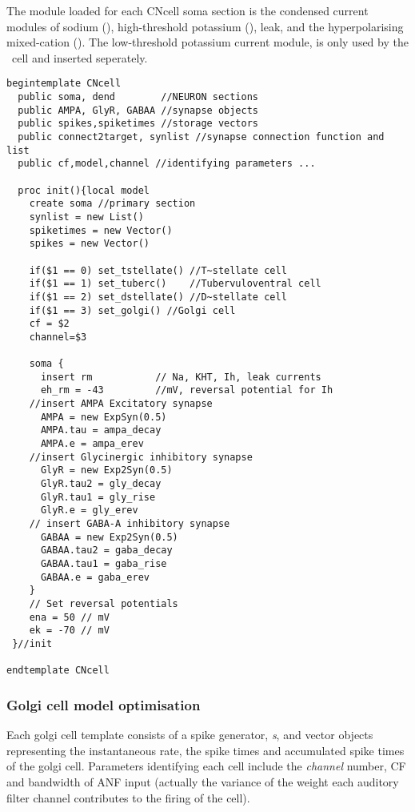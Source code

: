 The  module loaded for each \textsf{CNcell} soma section is the condensed
current modules of sodium (), high-threshold potassium (), leak,
and the hyperpolarising mixed-cation ().  The low-threshold potassium
current module, is only used by the \DS~cell and inserted seperately.

\begin{lstlisting}[label=lst:CellTemplate,caption=Rothman and Manis cochlear
  nucleus cell template (in CNcell.tem)]
  begintemplate CNcell
  public soma, dend        //NEURON sections
  public AMPA, GlyR, GABAA //synapse objects
  public spikes,spiketimes //storage vectors
  public connect2target, synlist //synapse connection function and list
  public cf,model,channel //identifying parameters ...

  proc init(){local model
    create soma //primary section
    synlist = new List()
    spiketimes = new Vector()
    spikes = new Vector()

    if($1 == 0) set_tstellate() //T~stellate cell
    if($1 == 1) set_tuberc()    //Tubervuloventral cell
    if($1 == 2) set_dstellate() //D~stellate cell
    if($1 == 3) set_golgi() //Golgi cell
    cf = $2
    channel=$3

    soma {
      insert rm           // Na, KHT, Ih, leak currents
      eh_rm = -43         //mV, reversal potential for Ih
    //insert AMPA Excitatory synapse
      AMPA = new ExpSyn(0.5)
      AMPA.tau = ampa_decay
      AMPA.e = ampa_erev
    //insert Glycinergic inhibitory synapse
      GlyR = new Exp2Syn(0.5)
      GlyR.tau2 = gly_decay
      GlyR.tau1 = gly_rise
      GlyR.e = gly_erev
    // insert GABA-A inhibitory synapse
      GABAA = new Exp2Syn(0.5)
      GABAA.tau2 = gaba_decay
      GABAA.tau1 = gaba_rise
      GABAA.e = gaba_erev
    }
    // Set reversal potentials
    ena = 50 // mV
    ek = -70 // mV
 }//init

endtemplate CNcell

\end{lstlisting}



\subsubsection[Golgi model]{Golgi cell model
  optimisation    \label{sec:APDX:golgi-cell-model}}

Each golgi cell template consists of a spike generator, \emph{s}, and vector
objects representing the instantaneous rate, the spike times and accumulated
spike times of the golgi cell. Parameters identifying each cell include the
\emph{channel} number, CF and bandwidth of ANF input (actually the variance of
the weight each auditory filter channel contributes to the firing of the cell).

